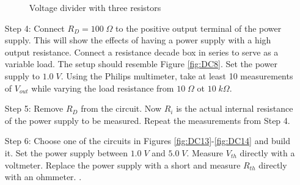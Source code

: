 \documentclass[12pt, a4paper, oneside, openright, titlepage]{book}
\begin{document}
\begin{itemize}[leftmargin = 50pt]
\begin{figure}[H]
    \caption{Voltage divider with three resistors}
    \label{fig:DC12}
\end{figure}
    \item[Step 4:] Connect $R_D = 100\;\Omega$ to the positive output terminal of the power supply. This will show the effects of having a power supply with a high output resistance. Connect a resistance decade box in series to serve as a variable load. The setup should resemble Figure \ref{fig:DC8}. Set the power supply to $1.0\;V$. Using the Philips multimeter, take at least 10 measurements of $V_{out}$ while varying the load resistance from $10\;\Omega$ ot $10\;k\Omega$.
    \item[Step 5:] Remove $R_D$ from the circuit. Now $R_i$ is the actual internal resistance of the power supply to be measured. Repeat the measurements from Step 4.
    \item[Step 6:] Choose one of the circuits in Figures \ref{fig:DC13}-\ref{fig:DC14} and build it. Set the power supply between $1.0\;V$ and $5.0\;V$. Measure $V_{th}$ directly with a voltmeter. Replace the power supply with a short and measure $R_{th}$ directly with an ohmmeter. .


\end{itemize}
\end{document}
